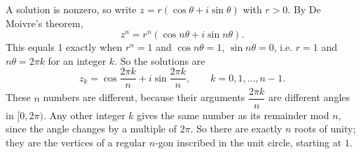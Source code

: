 A solution is nonzero, so write $z=r(\cos\theta+i\sin\theta)$ with $r>0$. By De Moivre's theorem,
\[z^n=r^n\left(\cos n\theta+i\sin n\theta\right).\]
This equals $1$ exactly when $r^n=1$ and $\cos n\theta=1$, $\sin n\theta=0$, i.e. $r=1$ and $n\theta=2\pi k$ for an integer $k$. So the solutions are
\[\boxed{z_k=\cos\dfrac{2\pi k}{n}+i\sin\dfrac{2\pi k}{n},\qquad k=0,1,\dots,n-1.}\]
These $n$ numbers are different, because their arguments $\dfrac{2\pi k}{n}$ are different angles in $[0,2\pi)$. Any other integer $k$ gives the same number as its remainder mod $n$, since the angle changes by a multiple of $2\pi$. So there are exactly $n$ roots of unity; they are the vertices of a regular $n$-gon inscribed in the unit circle, starting at $1$.
